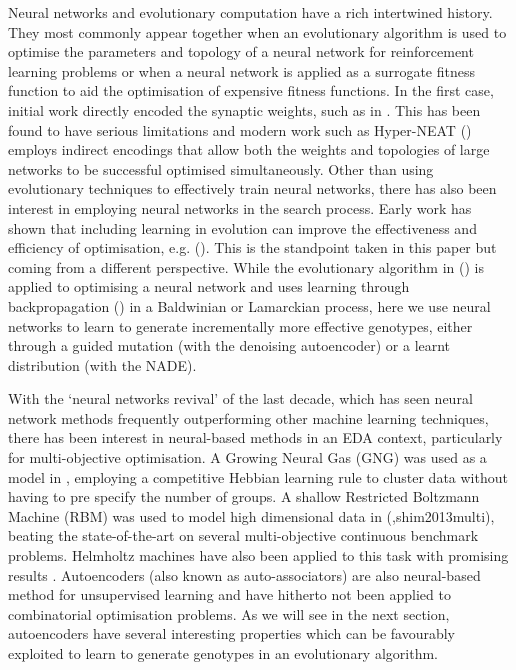 \documentclass[twoside]{article}
\begin{document}
Neural networks and evolutionary computation have a rich intertwined history. They most commonly appear together when an evolutionary algorithm is used to optimise the parameters and topology of a neural network for reinforcement learning problems or when a neural network is applied as a surrogate fitness function to aid the optimisation of expensive fitness functions. In the first case, initial work directly encoded the synaptic weights, such as in \cite{montana1989training}. This has been found to have serious limitations and modern work such as Hyper-NEAT (\cite{stanley2009hypercube}) employs indirect encodings that allow both the weights and topologies of large networks to be successful optimised simultaneously. Other than using evolutionary techniques to effectively train neural networks, there has also been interest in employing neural networks in the search process. Early work has shown that including learning in evolution can improve the effectiveness and efficiency of optimisation, e.g. (\cite{hinton1987learning,nolfi1994learning}). This is the standpoint taken in this paper but coming from a different perspective. While the evolutionary algorithm in (\cite{hinton1987learning,nolfi1994learning}) is applied to optimising a neural network and uses learning through backpropagation (\cite{rumelhart1988learning}) in a Baldwinian or Lamarckian process, here we use neural networks to learn to generate incrementally more effective genotypes, either through a guided mutation (with the denoising autoencoder) or a learnt distribution (with the NADE).

With the `neural networks revival' of the last decade, which has seen neural network methods frequently outperforming other machine learning techniques, there has been interest in neural-based methods in an EDA context, particularly for multi-objective optimisation. A Growing Neural Gas (GNG) was used as a model in \cite{marti2008introducing}, employing a competitive Hebbian learning rule to cluster data without having to pre specify the number of groups. A shallow Restricted Boltzmann Machine (RBM) was used to model high dimensional data in (\cite{tang2010restricted},shim2013multi), beating the state-of-the-art on several multi-objective continuous benchmark problems. Helmholtz machines have also been applied to this task with promising results \cite{zhang2000bayesian}. Autoencoders (also known as auto-associators) are also neural-based method for unsupervised learning and have hitherto not been applied to combinatorial optimisation problems. As we will see in the next section, autoencoders have several interesting properties which can be favourably exploited to learn to generate genotypes in an evolutionary algorithm.
\end{document}
